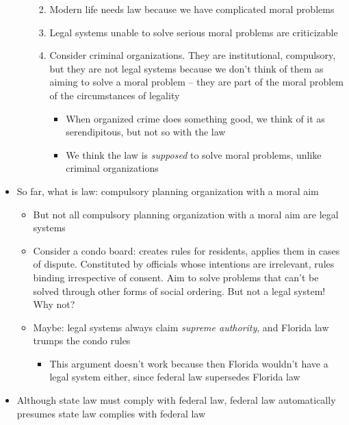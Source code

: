 \begin{itemize}
\begin{itemize}
    \begin{enumerate}
    \def\labelenumi{\arabic{enumi}.}
    \tightlist
    \item
      Modern life needs law because we have complicated moral problems
    \item
      Legal systems unable to solve serious moral problems are
      criticizable
    \item
      Consider criminal organizations. They are institutional,
      compulsory, but they are not legal systems because we don't think
      of them as aiming to solve a moral problem -- they are part of the
      moral problem of the circumstances of legality

      \begin{itemize}
      \tightlist
      \item
        When organized crime does something good, we think of it as
        serendipitous, but not so with the law
      \item
        We think the law is \emph{supposed} to solve moral problems,
        unlike criminal organizations
      \end{itemize}
    \end{enumerate}
  \end{itemize}
\item
  So far, what is law: compulsory planning organization with a moral aim

  \begin{itemize}
  \tightlist
  \item
    But not all compulsory planning organization with a moral aim are
    legal systems
  \item
    Consider a condo board: creates rules for residents, applies them in
    cases of dispute. Constituted by officials whose intentions are
    irrelevant, rules binding irrespective of consent. Aim to solve
    problems that can't be solved through other forms of social
    ordering. But not a legal system! Why not?
  \item
    Maybe: legal systems always claim \emph{supreme authority}, and
    Florida law trumps the condo rules

    \begin{itemize}
    \tightlist
    \item
      This argument doesn't work because then Florida wouldn't have a
      legal system either, since federal law supersedes Florida law
    \end{itemize}
  \end{itemize}
\item
  Although state law must comply with federal law, federal law
  automatically presumes state law complies with federal law


\end{itemize}
